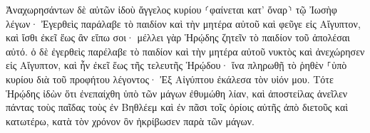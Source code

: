 \documentclass{openreader}
\begin{document}
Ἀναχωρησάντων δὲ αὐτῶν ἰδοὺ ἄγγελος κυρίου ⸂φαίνεται κατ’ ὄναρ⸃ τῷ Ἰωσὴφ λέγων· Ἐγερθεὶς παράλαβε τὸ παιδίον καὶ τὴν μητέρα αὐτοῦ καὶ φεῦγε εἰς Αἴγυπτον, καὶ ἴσθι ἐκεῖ ἕως ἂν εἴπω σοι· μέλλει γὰρ Ἡρῴδης ζητεῖν τὸ παιδίον τοῦ ἀπολέσαι αὐτό. 
ὁ δὲ ἐγερθεὶς παρέλαβε τὸ παιδίον καὶ τὴν μητέρα αὐτοῦ νυκτὸς καὶ ἀνεχώρησεν εἰς Αἴγυπτον, 
καὶ ἦν ἐκεῖ ἕως τῆς τελευτῆς Ἡρῴδου· ἵνα πληρωθῇ τὸ ῥηθὲν ⸀ὑπὸ κυρίου διὰ τοῦ προφήτου λέγοντος· Ἐξ Αἰγύπτου ἐκάλεσα τὸν υἱόν μου. 
Τότε Ἡρῴδης ἰδὼν ὅτι ἐνεπαίχθη ὑπὸ τῶν μάγων ἐθυμώθη λίαν, καὶ ἀποστείλας ἀνεῖλεν πάντας τοὺς παῖδας τοὺς ἐν Βηθλέεμ καὶ ἐν πᾶσι τοῖς ὁρίοις αὐτῆς ἀπὸ διετοῦς καὶ κατωτέρω, κατὰ τὸν χρόνον ὃν ἠκρίβωσεν παρὰ τῶν μάγων. 
\end{document}
